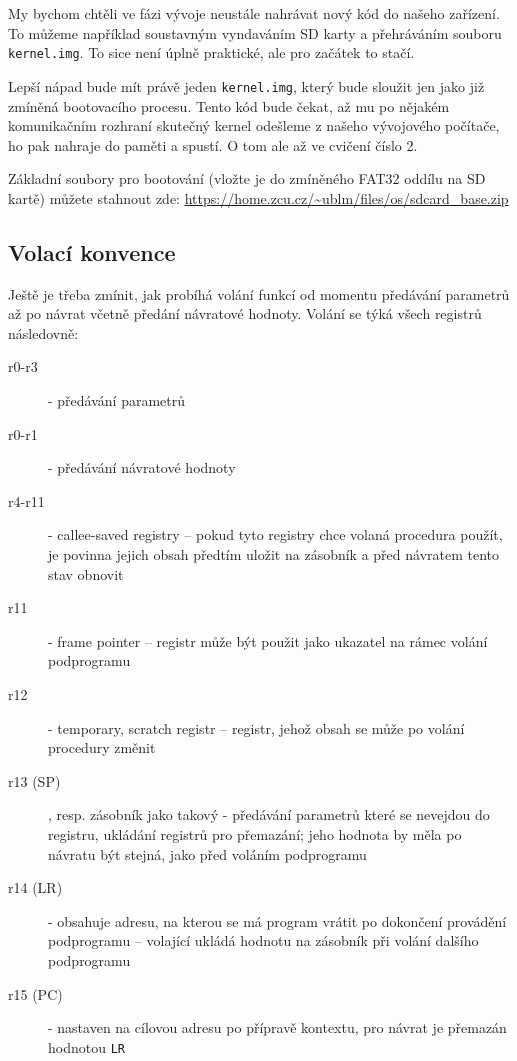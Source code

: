 \documentclass{article}
\begin{document}
My bychom chtěli ve fázi vývoje neustále nahrávat nový kód do našeho zařízení. To můžeme například soustavným vyndaváním SD karty a přehráváním souboru \texttt{kernel.img}. To sice není úplně praktické, ale pro začátek to stačí.

Lepší nápad bude mít právě jeden \texttt{kernel.img}, který bude sloužit jen jako již zmíněná  bootovacího procesu. Tento kód bude čekat, až mu po nějakém komunikačním rozhraní skutečný kernel odešleme z našeho vývojového počítače,  ho pak nahraje do paměti a spustí. O tom ale až ve cvičení číslo 2.

Základní soubory pro bootování (vložte je do zmíněného FAT32 oddílu na SD kartě) můžete stahnout zde: \url{https://home.zcu.cz/~ublm/files/os/sdcard_base.zip}

\subsection{Volací konvence}

Ještě je třeba zmínit, jak probíhá volání funkcí od momentu předávání parametrů až po návrat včetně předání návratové hodnoty. Volání se týká všech registrů následovně:

\begin{description}
	\item[r0-r3] - předávání parametrů
	\item[r0-r1] - předávání návratové hodnoty
	\item[r4-r11] - callee-saved registry -- pokud tyto registry chce volaná procedura použít, je povinna jejich obsah předtím uložit na zásobník a před návratem tento stav obnovit
	\item[r11] - frame pointer -- registr může být použit jako ukazatel na rámec volání podprogramu
	\item[r12] - temporary, scratch registr -- registr, jehož obsah se může po volání procedury změnit
	\item[r13 (SP)], resp. zásobník jako takový - předávání parametrů které se nevejdou do registru, ukládání registrů pro přemazání; jeho hodnota by měla po návratu být stejná, jako před voláním podprogramu
	\item[r14 (LR)] - obsahuje adresu, na kterou se má program vrátit po dokončení provádění podprogramu -- volající ukládá hodnotu na zásobník při volání dalšího podprogramu
	\item[r15 (PC)] - nastaven na cílovou adresu po přípravě kontextu, pro návrat je přemazán hodnotou \texttt{LR}
\end{description}
\end{document}
